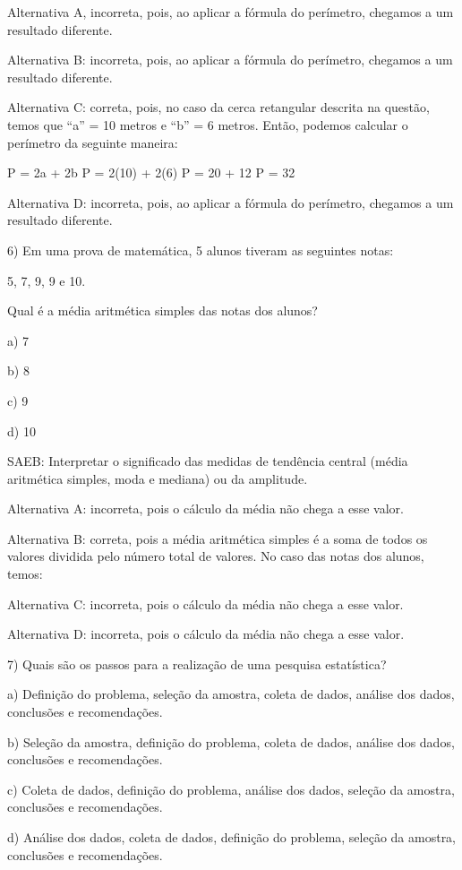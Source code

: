 Alternativa A, incorreta, pois, ao aplicar a fórmula do perímetro,
chegamos a um resultado diferente.

Alternativa B: incorreta, pois, ao aplicar a fórmula do perímetro,
chegamos a um resultado diferente.

Alternativa C: correta, pois, no caso da cerca retangular descrita na
questão, temos que ``a'' = 10 metros e ``b'' = 6 metros. Então, podemos
calcular o perímetro da seguinte maneira:

P = 2a + 2b P = 2(10) + 2(6) P = 20 + 12 P = 32

Alternativa D: incorreta, pois, ao aplicar a fórmula do perímetro,
chegamos a um resultado diferente.

6) Em uma prova de matemática, 5 alunos tiveram as seguintes notas:

5, 7, 9, 9 e 10.

Qual é a média aritmética simples das notas dos alunos?

a) 7

b) 8

c) 9

d) 10

SAEB: Interpretar o significado das medidas de tendência central (média
aritmética simples, moda e mediana) ou da amplitude.

Alternativa A: incorreta, pois o cálculo da média não chega a esse
valor.

Alternativa B: correta, pois a média aritmética simples é a soma de
todos os valores dividida pelo número total de valores. No caso das
notas dos alunos, temos:

Alternativa C: incorreta, pois o cálculo da média não chega a esse
valor.

Alternativa D: incorreta, pois o cálculo da média não chega a esse
valor.

7) Quais são os passos para a realização de uma pesquisa estatística?

a) Definição do problema, seleção da amostra, coleta de dados, análise
dos dados, conclusões e recomendações.

b) Seleção da amostra, definição do problema, coleta de dados, análise
dos dados, conclusões e recomendações.

c) Coleta de dados, definição do problema, análise dos dados, seleção da
amostra, conclusões e recomendações.

d) Análise dos dados, coleta de dados, definição do problema, seleção da
amostra, conclusões e recomendações.

